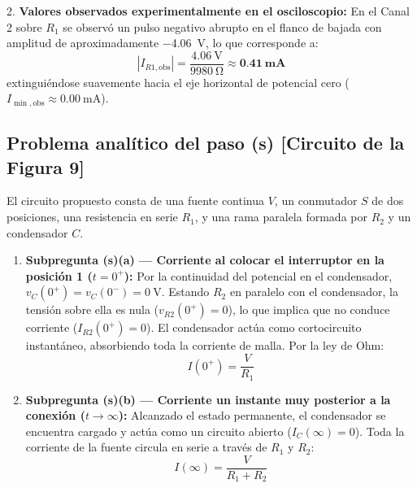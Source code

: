 \begin{appendices}
2. \textbf{Valores observados experimentalmente en el osciloscopio:}
En el Canal 2 sobre $R_1$ se observó un pulso negativo abrupto en el flanco de bajada con amplitud de aproximadamente \qty{-4,06}{\volt}, lo que corresponde a:
\begin{equation*}
    |I_{R1,\text{obs}}| = \frac{\qty{4,06}{\volt}}{\qty{9980}{\ohm}} \approx \mathbf{\qty{0,41}{\milli\ampere}}
\end{equation*}
extinguiéndose suavemente hacia el eje horizontal de potencial cero ($I_{\min,\text{obs}} \approx \qty{0,00}{\milli\ampere}$).

\subsection{Problema analítico del paso (s) [Circuito de la Figura 9]}
\label{subsec:problema_paso_s}

El circuito propuesto consta de una fuente continua $V$, un conmutador $S$ de dos posiciones, una resistencia en serie $R_1$, y una rama paralela formada por $R_2$ y un condensador $C$.

\begin{enumerate}
    \item \textbf{Subpregunta (s)(a) --- Corriente al colocar el interruptor en la posición 1 ($t = 0^+$):}
    Por la continuidad del potencial en el condensador, $v_C(0^+) = v_C(0^-) = \qty{0}{\volt}$. Estando $R_2$ en paralelo con el condensador, la tensión sobre ella es nula ($v_{R2}(0^+) = 0$), lo que implica que no conduce corriente ($I_{R2}(0^+) = 0$). El condensador actúa como cortocircuito instantáneo, absorbiendo toda la corriente de malla. Por la ley de Ohm:
    \begin{equation}
        \boxed{I(0^+) = \frac{V}{R_1}}
    \end{equation}
    
    \item \textbf{Subpregunta (s)(b) --- Corriente un instante muy posterior a la conexión ($t \to \infty$):}
    Alcanzado el estado permanente, el condensador se encuentra cargado y actúa como un circuito abierto ($I_C(\infty) = 0$). Toda la corriente de la fuente circula en serie a través de $R_1$ y $R_2$:
    \begin{equation}
        \boxed{I(\infty) = \frac{V}{R_1 + R_2}}
    \end{equation}
    

\end{enumerate}
\end{appendices}

